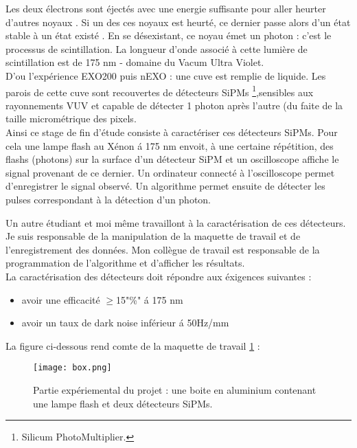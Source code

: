 \documentclass[a4paper, 11pt]{report}%
\begin{document}
  \indent Les deux \'electrons sont \'eject\'es avec une energie suffisante pour aller heurter d'autres noyaux . Si un des ces noyaux est heurt\'e, 
  ce dernier passe alors d'un \'etat stable \`a un \'etat exist\'e . En se d\'esexistant, ce noyau \'emet un photon : c'est le processus de 
  scintillation. La longueur d'onde associ\'e \`a cette lumi\`ere de scintillation est de 175 nm - domaine du Vacum Ultra Violet.
  \\
  
  D'ou l'exp\'erience EXO200 puis nEXO : une cuve est remplie de  liquide. Les parois de cette cuve sont recouvertes de d\'etecteurs SiPMs 
  \footnote{Silicum PhotoMultiplier.},sensibles aux rayonnements VUV et capable de détecter 1 photon après l'autre (du faite de la taille micrométrique des pixels.
  \\  
  Ainsi ce stage de fin d'\'etude consiste \`a caract\'eriser ces d\'etecteurs SiPMs. Pour cela une lampe flash au X\'enon \' a 175 nm envoit, \`a une certaine r\'ep\'etition, 
  des flashs (photons) sur la surface d'un d\'etecteur SiPM et un oscilloscope affiche le signal provenant de ce dernier. Un ordinateur connect\'e \`a 
  l'oscilloscope permet d'enregistrer le signal observ\'e. Un algorithme permet ensuite de d\'etecter les pulses correspondant \`a la d\'etection d'un photon. 
  
  Un autre \'etudiant et moi m\^eme travaillont \`a la caract\'erisation de ces d\'etecteurs. Je suis responsable de la manipulation de la maquette de travail
  et de l'enregistrement des donn\'ees. Mon coll\`egue de travail est responsable de la programmation de l'algorithme et d'afficher les r\'esultats.
  \\
  La caract\'erisation des d\'etecteurs doit r\'epondre aux \'exigences suivantes : 
  \begin{itemize}
   \item avoir une efficacit\'e \(\geq\)15"\%" \'a 175 nm
   \item avoir un taux de dark noise inf\'erieur \'a 50Hz/mm\texttwosuperior{}
  \end{itemize}
  \vspace*{5mm}
  
  La figure ci-dessous rend comte de la maquette de travail \ref{fig:box} :
  \begin{figure}[!hbtp]
  \centering
  \texttt{[image: box.png]}%
  \caption{Partie exp\'eriemental du projet : une boite en aluminium contenant une lampe flash et deux d\'etecteurs SiPMs.}
  \label{fig:box}
  \end{figure}
  
\end{document}
